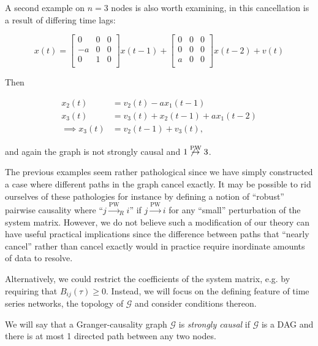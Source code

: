 \documentclass[12pt]{article}
\def\pwgc{\overset{\text{PW}}{\rightarrow}}  %
\def\gcg{\mathcal{G}}  %
\begin{document}
\begin{example}
  A second example on $n = 3$ nodes is also worth examining, in this
  cancellation is a result of differing time lags:

\begin{equation*}
  x(t) =
  \left[
    \begin{array}{ccc}
      0 & 0 & 0\\
      -a & 0 & 0\\
      0 & 1 & 0\\
    \end{array}
  \right] x(t - 1) +
  \left[
    \begin{array}{ccc}
      0 & 0 & 0\\
      0 & 0 & 0\\
      a & 0 & 0\\
    \end{array}
  \right] x(t - 2) + v(t)
\end{equation*}

Then

\begin{align*}
  x_2(t) &= v_2(t) - ax_1(t - 1)\\
  x_3(t) &= v_3(t) + x_2(t - 1) + ax_1(t - 2)\\
  \implies x_3(t) &= v_2(t - 1) + v_3(t),
\end{align*}

and again the graph is not strongly causal and $1 \not\pwgc 3$.
\end{example}

The previous examples seem rather pathological since we have simply
constructed a case where different paths in the graph cancel exactly.
It may be possible to rid ourselves of these pathologies for instance
by defining a notion of ``robust'' pairwise causality where
``$j \pwgc _R i$'' if $j \pwgc i$ for any ``small'' perturbation of
the system matrix.  However, we do not believe such a modification of
our theory can have useful practical implications since the difference
between paths that ``nearly cancel'' rather than cancel exactly would
in practice require inordinate amounts of data to resolve.

Alternatively, we could restrict the coefficients of the system
matrix, e.g. by requiring that $B_{ij}(\tau) \ge 0$.  Instead, we will
focus on the defining feature of time series networks, the topology of
$\gcg$ and consider conditions thereon.

\begin{definition}
  We will say that a Granger-causality graph $\gcg$ is \textit{strongly causal}
if $\gcg$ is a DAG and there is at most 1 directed path between any two nodes.
\end{definition}
\end{document}
